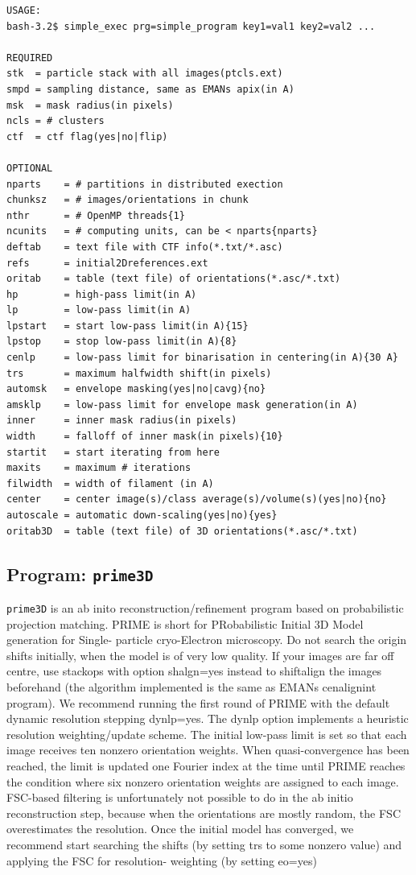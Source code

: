 \documentclass[a4paper,11pt]{article}
\newcommand{\prgname}[1]{\textcolor{NavyBlue}{\texttt{#1}}}
\begin{document}
\begin{verbatim}
USAGE:
bash-3.2$ simple_exec prg=simple_program key1=val1 key2=val2 ...

REQUIRED
stk  = particle stack with all images(ptcls.ext)
smpd = sampling distance, same as EMANs apix(in A)
msk  = mask radius(in pixels)
ncls = # clusters
ctf  = ctf flag(yes|no|flip)

OPTIONAL
nparts    = # partitions in distributed exection
chunksz   = # images/orientations in chunk
nthr      = # OpenMP threads{1}
ncunits   = # computing units, can be < nparts{nparts}
deftab    = text file with CTF info(*.txt/*.asc)
refs      = initial2Dreferences.ext
oritab    = table (text file) of orientations(*.asc/*.txt)
hp        = high-pass limit(in A)
lp        = low-pass limit(in A)
lpstart   = start low-pass limit(in A){15}
lpstop    = stop low-pass limit(in A){8}
cenlp     = low-pass limit for binarisation in centering(in A){30 A}
trs       = maximum halfwidth shift(in pixels)
automsk   = envelope masking(yes|no|cavg){no}
amsklp    = low-pass limit for envelope mask generation(in A)
inner     = inner mask radius(in pixels)
width     = falloff of inner mask(in pixels){10}
startit   = start iterating from here
maxits    = maximum # iterations
filwidth  = width of filament (in A)
center    = center image(s)/class average(s)/volume(s)(yes|no){no}
autoscale = automatic down-scaling(yes|no){yes}
oritab3D  = table (text file) of 3D orientations(*.asc/*.txt)
\end{verbatim}

\subsection{Program: \prgname{prime3D}}
\label{prime3D}
\prgname{prime3D} is an ab inito reconstruction/refinement program based on probabilistic projection matching. PRIME is short for PRobabilistic Initial 3D Model generation for Single- particle cryo-Electron microscopy. Do not search the origin shifts initially, when the model is of very low quality. If your images are far off centre, use stackops with option shalgn=yes instead to shiftalign the images beforehand (the algorithm implemented is the same as EMANs cenalignint program). We recommend running the first round of PRIME with the default dynamic resolution stepping dynlp=yes. The dynlp option implements a heuristic resolution weighting/update scheme. The initial low-pass limit is set so that each image receives ten nonzero orientation weights. When quasi-convergence has been reached, the limit is updated one Fourier index at the time until PRIME reaches the condition where six nonzero orientation weights are assigned to each image. FSC-based filtering is unfortunately not possible to do in the ab initio reconstruction step, because when the orientations are mostly random, the FSC overestimates the resolution. Once the initial model has converged, we recommend start searching the shifts (by setting trs to some nonzero value) and applying the FSC for resolution- weighting (by setting eo=yes)
\end{document}
